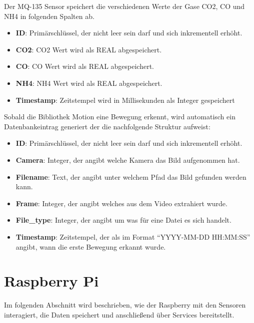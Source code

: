 Der MQ-135 Sensor speichert die verschiedenen Werte der Gase CO2, CO und NH4 in folgenden Spalten ab.
\begin{itemize}
	\item \textbf{ID}: Primärschlüssel, der nicht leer sein darf und sich inkrementell erhöht.  
	\item \textbf{CO2}: CO2 Wert wird als REAL abgespeichert.
	\item \textbf{CO}: CO Wert wird als REAL abgespeichert.
	\item \textbf{NH4}: NH4 Wert wird als REAL abgespeichert. 
	\item \textbf{Timestamp}: Zeitstempel wird in Millisekunden als Integer gespeichert
\end{itemize}

Sobald die Bibliothek Motion eine Bewegung erkennt, wird automatisch ein Datenbankeintrag generiert der die nachfolgende Struktur aufweist:
\begin{itemize}
	\item \textbf{ID}: Primärschlüssel, der nicht leer sein darf und sich inkrementell erhöht.  
	\item \textbf{Camera}: Integer, der angibt welche Kamera das Bild aufgenommen hat.
	\item \textbf{Filename}: Text, der angibt unter welchem Pfad das Bild gefunden werden kann.
	\item \textbf{Frame}: Integer, der angibt welches aus dem Video extrahiert wurde. 
	\item \textbf{File\_type}: Integer, der angibt um was für eine Datei es sich handelt.
	\item \textbf{Timestamp}: Zeitstempel, der als im Format \enquote{YYYY-MM-DD HH:MM:SS} angibt, wann die erste Bewegung erkannt wurde.	
\end{itemize}


\section{Raspberry Pi} 
Im folgenden Abschnitt wird beschrieben, wie der Raspberry mit den Sensoren interagiert, die Daten speichert und anschließend über Services bereitstellt.

